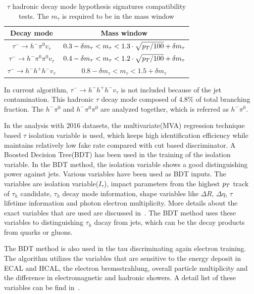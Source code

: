 \begin{table}[htp]
\caption{$\tau$ hadronic decay mode hypothesis signatures compatibility tests. The $m_{\tau}$ is required to be in the mass window }\label{tb:tauHdecayRecomass}
\begin{center}
\begin{tabular}{|c|c|}
\hline
Decay mode                                             & Mass window\\\hline
$\tau^{-}\to h^{-}\pi^{0} v_{\tau}$                       & $0.3-\delta m_{\tau}<m_{\tau}<1.3\cdot \sqrt{p_{T}/100}+\delta m_{\tau}$      \\\hline
$\tau^{-}\to h^{-}\pi^{0} \pi^{0}  v_{\tau}$       &  $0.4-\delta m_{\tau}<m_{\tau}<1.2\cdot \sqrt{p_{T}/100}+\delta m_{\tau}$   \\\hline
$\tau^{-}\to h^{-}h^{+}h^{-}v_{\tau}$                     & $0.8-\delta m_{\tau}<m_{\tau}<1.5+\delta m_{\tau}$   \\\hline
 \end{tabular}
\end{center}
\end{table}

In current algorithm, $\tau^{-}\to h^{-}h^{+}h^{-}v_{\tau}$ is not included because of the jet contamination. This hadronic $\tau$ decay mode composed of 4.8\% of total branching fraction. The $h^{-}\pi^{0}$ and $h^{-}\pi^{0}\pi^{0}$ are analyzed together, which is referred as $h^{-}\pi^{0}$.

In the analysis with 2016 datasets, the multivariate(MVA) regression technique based $\tau$ isolation variable is used, which keeps high identification efficiency while maintains relatively low fake rate compared with cut based discriminator. A Boosted Decision Tree(BDT) has been used in the training of the isolation variable. In the BDT method, the isolation variable shows a good distinguishing power against jets. Various variables have been used as BDT inputs. The variables are isolation variable($I_{\tau}$), impact parameters from the highest $p_{T}$ track of $\tau_{h}$ candidate, $\tau_{h}$ decay mode information, shape variables like $\Delta R$, $\Delta \eta$, $\tau$ lifetime information and photon electron multiplicity. More details about the exact variables that are used are discussed in~\cite{TauRecoandIDRunII,TauReconstuction}. The BDT method uses these variables to distinguishing $\tau_{h}$ dacay from jets, which can be the decay products from quarks or gluons.  

The BDT method is also used in the tau discriminating again electron training. The algorithm utilizes the variables that are sensitive to the energy deposit in ECAL and HCAL, the electron bremsstrahlung, overall particle multiplicity and the difference in electromagnetic and hadronic showers. A detail list of these variables can be find in~\cite{TauRecoandIDRunII,TauReconstuction}.

